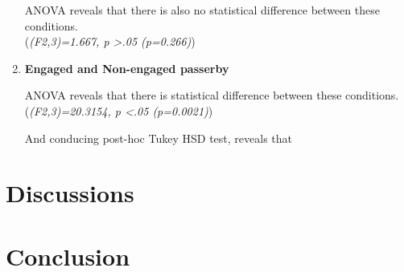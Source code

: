 \begin{enumerate}
ANOVA reveals that there is also no statistical difference between these conditions. \\
(\emph{(F2,3)=1.667, p >.05 (p=0.266)})



\item \textbf{Engaged and Non-engaged passerby}


\begin{table}[H]
\caption{Number of engaged passerby in three weeks}
\label{tab:engagedofthreeweeks}
\centering
{}
\end{table}

ANOVA reveals that there is statistical difference between these conditions. \\
(\emph{(F2,3)=20.3154, p <.05 (p=0.0021)})

And conducing post-hoc Tukey HSD test, reveals that 

\begin{table}[H]
\caption{Post-Hoc Tukey’s HSD}
\label{tab:engage-non-posthoctukey}
\centering
{}
\end{table}


\end{enumerate}



\section{Discussions}




\section{Conclusion}
